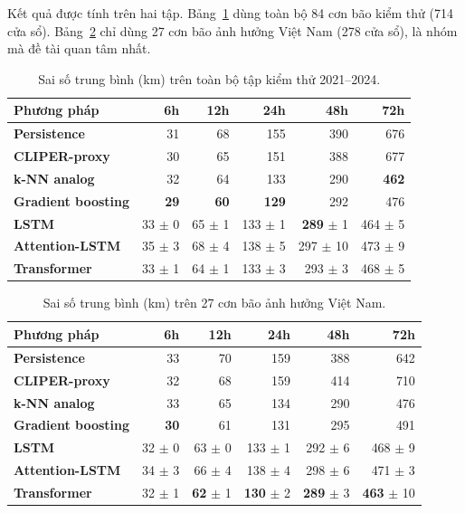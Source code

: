 Kết quả được tính trên hai tập. Bảng~\ref{tab:ketqua-all} dùng toàn bộ 84 cơn
bão kiểm thử (714 cửa sổ). Bảng~\ref{tab:ketqua-vn} chỉ dùng 27 cơn bão ảnh
hưởng Việt Nam (278 cửa sổ), là nhóm mà đề tài quan tâm nhất.

\begin{table}[H]
\centering
\caption{Sai số trung bình (km) trên toàn bộ tập kiểm thử 2021--2024.}
\label{tab:ketqua-all}
\begin{tabular*}{\textwidth}{@{\extracolsep{\fill}}>{\bfseries\color{daunavy}}l rrrrr}
\toprule
\rowcolor{gray100}\bfseries\color{daunavy}Phương pháp & \bfseries\color{daumaroon}6h & \bfseries\color{daumaroon}12h & \bfseries\color{daumaroon}24h & \bfseries\color{daumaroon}48h & \bfseries\color{daumaroon}72h \\
\midrule
Persistence       & 31 & 68 & 155 & 390 & 676 \\
CLIPER-proxy      & 30 & 65 & 151 & 388 & 677 \\
k-NN analog       & 32 & 64 & 133 & 290 & \textbf{462} \\
Gradient boosting & \textbf{29} & \textbf{60} & \textbf{129} & 292 & 476 \\
LSTM              & 33 $\pm$ 0 & 65 $\pm$ 1 & 133 $\pm$ 1 & \textbf{289} $\pm$ 1 & 464 $\pm$ 5 \\
Attention-LSTM    & 35 $\pm$ 3 & 68 $\pm$ 4 & 138 $\pm$ 5 & 297 $\pm$ 10 & 473 $\pm$ 9 \\
Transformer       & 33 $\pm$ 1 & 64 $\pm$ 1 & 133 $\pm$ 3 & 293 $\pm$ 3 & 468 $\pm$ 5 \\
\bottomrule
\end{tabular*}
\end{table}

\begin{table}[H]
\centering
\caption{Sai số trung bình (km) trên 27 cơn bão ảnh hưởng Việt Nam.}
\label{tab:ketqua-vn}
\begin{tabular*}{\textwidth}{@{\extracolsep{\fill}}>{\bfseries\color{daunavy}}l rrrrr}
\toprule
\rowcolor{gray100}\bfseries\color{daunavy}Phương pháp & \bfseries\color{daumaroon}6h & \bfseries\color{daumaroon}12h & \bfseries\color{daumaroon}24h & \bfseries\color{daumaroon}48h & \bfseries\color{daumaroon}72h \\
\midrule
Persistence       & 33 & 70 & 159 & 388 & 642 \\
CLIPER-proxy      & 32 & 68 & 159 & 414 & 710 \\
k-NN analog       & 33 & 65 & 134 & 290 & 476 \\
Gradient boosting & \textbf{30} & 61 & 131 & 295 & 491 \\
LSTM              & 32 $\pm$ 0 & 63 $\pm$ 0 & 133 $\pm$ 1 & 292 $\pm$ 6 & 468 $\pm$ 9 \\
Attention-LSTM    & 34 $\pm$ 3 & 66 $\pm$ 4 & 138 $\pm$ 4 & 298 $\pm$ 6 & 471 $\pm$ 3 \\
Transformer       & 32 $\pm$ 1 & \textbf{62} $\pm$ 1 & \textbf{130} $\pm$ 2 & \textbf{289} $\pm$ 3 & \textbf{463} $\pm$ 10 \\
\bottomrule
\end{tabular*}
\end{table}

